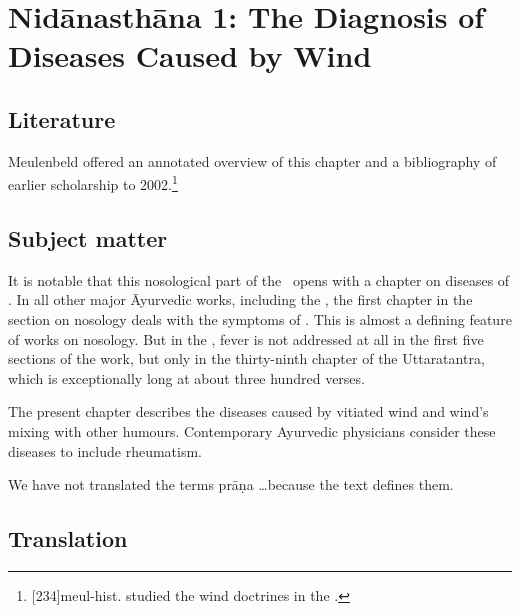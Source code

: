 
\chapter{Nidānasthāna 1: The Diagnosis of Diseases Caused by Wind}


\section{Literature}

Meulenbeld offered an annotated overview of this chapter and a bibliography of
earlier scholarship to 2002.\footnote{[234]{meul-hist}.
\citep{rube-1954b} studied the wind doctrines in the \CS.}


\section{Subject matter}

It is notable that this nosological part of the \SS\ opens with a chapter on
diseases of .  In all other major Āyurvedic works, including the
\CS, the first chapter in the section on nosology deals with the symptoms of
.  This is almost a defining feature of works on nosology.  But
in the \SS, fever is not addressed at all in the first five sections of the
work, but only in the thirty-ninth chapter of the Uttaratantra, which is
exceptionally long at about three hundred verses.

The present chapter describes the diseases caused by vitiated wind and wind's
mixing with other humours. Contemporary Ayurvedic physicians consider these
diseases to include rheumatism. 

We have not translated the terms prāṇa \ldots because the text defines
them.

\section{Translation}

